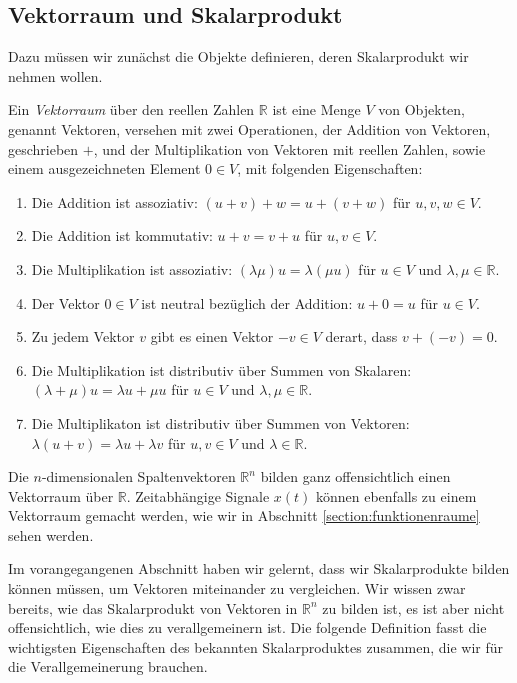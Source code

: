 \subsection{Vektorraum und Skalarprodukt}
Dazu müssen wir zunächst die Objekte definieren, deren Skalarprodukt wir
nehmen wollen.
\begin{definition}
Ein {\em Vektorraum} über den reellen Zahlen $\mathbb R$ ist eine Menge $V$ 
%
von Objekten, genannt Vektoren, versehen mit zwei Operationen, der
Addition von Vektoren, geschrieben $+$, und der Multiplikation von Vektoren
mit reellen Zahlen, sowie einem ausgezeichneten Element $0\in V$, mit
folgenden Eigenschaften:
\begin{enumerate}
\item Die Addition ist assoziativ: $(u+v)+w = u+(v+w)$ für $u,v,w\in V$.
\item Die Addition ist kommutativ: $u+v=v+u$ für $u,v\in V$.
\item Die Multiplikation ist assoziativ: $(\lambda \mu)u=\lambda (\mu u)$ für
$u\in V$ und $\lambda,\mu\in\mathbb R$.
\item Der Vektor $0\in V$ ist neutral bezüglich der Addition: $u+0=u$ für
$u\in V$.
\item Zu jedem Vektor $v$ gibt es einen Vektor $-v\in V$ derart, dass
$v+(-v)=0$.
\item Die Multiplikation ist distributiv über Summen von Skalaren:
$(\lambda + \mu) u = \lambda u + \mu u$ für $u\in V$ und
$\lambda,\mu\in \mathbb R$.
\item Die Multiplikaton ist distributiv über Summen von Vektoren:
$\lambda (u + v) = \lambda u + \lambda v$ für $u,v\in V$ und
$\lambda\in\mathbb R$.
\end{enumerate}
\end{definition}
Die $n$-dimensionalen Spaltenvektoren $\mathbb R^n$ bilden ganz offensichtlich
einen Vektorraum über $\mathbb R$.
Zeitabhängige Signale $x(t)$ können ebenfalls zu einem Vektorraum gemacht
werden, wie wir in Abschnitt \ref{section:funktionenraume} sehen werden.

Im vorangegangenen Abschnitt haben wir gelernt, dass wir Skalarprodukte
bilden können müssen, um Vektoren miteinander zu vergleichen.
Wir wissen zwar bereits, wie das Skalarprodukt von Vektoren in 
$\mathbb R^n$ zu bilden ist, es ist aber nicht offensichtlich, wie
dies zu verallgemeinern ist.
Die folgende Definition fasst die wichtigsten Eigenschaften des
bekannten Skalarproduktes zusammen, die wir für die Verallgemeinerung
brauchen.

